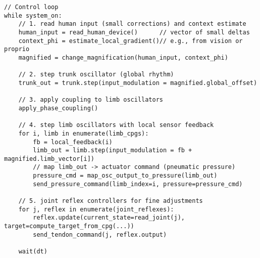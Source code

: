 \documentclass[12pt]{article}
\begin{document}
\begin{verbatim}
// Control loop
while system_on:
    // 1. read human input (small corrections) and context estimate
    human_input = read_human_device()      // vector of small deltas
    context_phi = estimate_local_gradient()// e.g., from vision or proprio
    magnified = change_magnification(human_input, context_phi)

    // 2. step trunk oscillator (global rhythm)
    trunk_out = trunk.step(input_modulation = magnified.global_offset)

    // 3. apply coupling to limb oscillators
    apply_phase_coupling()

    // 4. step limb oscillators with local sensor feedback
    for i, limb in enumerate(limb_cpgs):
        fb = local_feedback(i)
        limb_out = limb.step(input_modulation = fb + magnified.limb_vector[i])
        // map limb_out -> actuator command (pneumatic pressure)
        pressure_cmd = map_osc_output_to_pressure(limb_out)
        send_pressure_command(limb_index=i, pressure=pressure_cmd)

    // 5. joint reflex controllers for fine adjustments
    for j, reflex in enumerate(joint_reflexes):
        reflex.update(current_state=read_joint(j), target=compute_target_from_cpg(...))
        send_tendon_command(j, reflex.output)

    wait(dt)
\end{verbatim}
\end{document}
